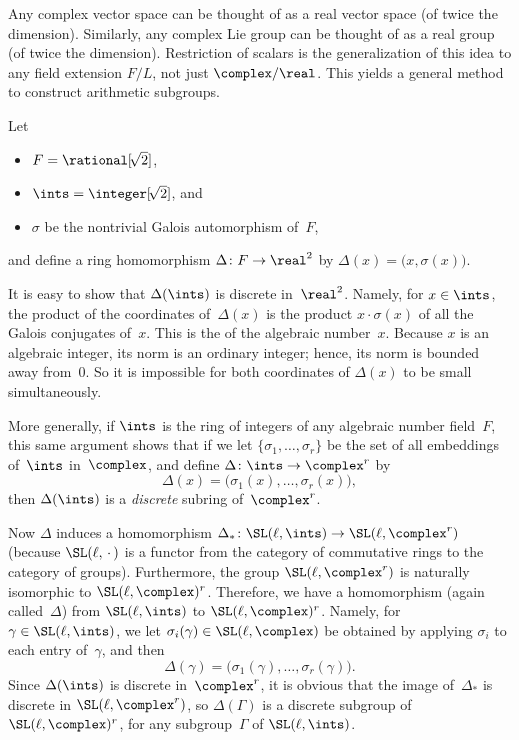 Any complex vector space can be thought of as a real vector
space (of twice the dimension). Similarly, any complex Lie
group can be thought of as a real group (of twice the
dimension). Restriction of scalars is the generalization of
this idea to any field extension $F/L$, not just
$\complex/\real$. This yields a general method to construct
arithmetic subgroups. 

\begin{eg}
 Let 
 \begin{itemize}
 \item $F = \rational[\!\sqrt{2}]$,
 \item $\ints = \integer[\!\sqrt{2}]$, and
 \item $\sigma$ be the nontrivial Galois automorphism of~$F$,
 \end{itemize}
 and define a ring homomorphism $\Delta \colon F \to
\real^2$ by 
 $\Delta(x) = \bigl( x, \sigma(x) \bigr) $.

 It is easy to show that $\Delta(\ints)$ is discrete
in~$\real^2$. Namely, for $x \in \ints$, the product
of the coordinates of~$\Delta(x)$ is the product $x \cdot
\sigma(x)$ of all the Galois conjugates of~$x$. This is the
 of the algebraic
number~$x$. Because $x$ is an algebraic integer, its norm is
an ordinary integer; hence, its norm is bounded away
from~$0$. So it is impossible for both coordinates of
$\Delta(x)$ to be small simultaneously.

More generally, if $\ints$ is the ring of integers of
any algebraic number field~$F$, this same argument shows that if we let
$\{ \sigma_1, \ldots, \sigma_r \}$ be the set of all
embeddings of~$\ints$ in~$\complex$, and define
 $\Delta \colon \ints \to \complex^r$
 by 
 $$ \Delta(x) = \bigl( \sigma_1(x), \ldots, \sigma_r(x) \bigr) , $$
 then $\Delta( \ints )$ is a \emph{discrete} subring
of~$\complex^r$. 

Now $\Delta$ induces a homomorphism $\Delta_* \colon \SL(\ell, \ints) \to \SL(\ell, \complex^r)$ (because $\SL(\ell, \,{\cdot}\,)$ is a functor from the category of commutative rings to the category of groups). Furthermore, the group $\SL(\ell, \complex^r)$ is naturally isomorphic to $\SL(\ell, \complex)^r$. Therefore, we have a homomorphism (again called~$\Delta$) from $\SL(\ell, \ints)$ to  $\SL(\ell, \complex)^r$. Namely, for $\gamma \in \SL(\ell, \ints)$, we let $\sigma_i(\gamma) \in \SL(\ell,\complex)$ be obtained by applying $\sigma_i$ to each entry of~$\gamma$, and then
 $$ \Delta(\gamma) = \bigl( \sigma_1(\gamma), \ldots, \sigma_r(\gamma) \bigr) .$$
Since $\Delta(\ints)$ is discrete in~$\complex^r$, it is obvious that the image of~$\Delta_*$ is discrete in $\SL(\ell, \complex^r)$, so $\Delta(\Gamma)$ is a discrete subgroup
of $\SL(\ell,\complex)^r$, for any subgroup~$\Gamma$ of
$\SL(\ell,\ints)$. 
 \end{eg}

